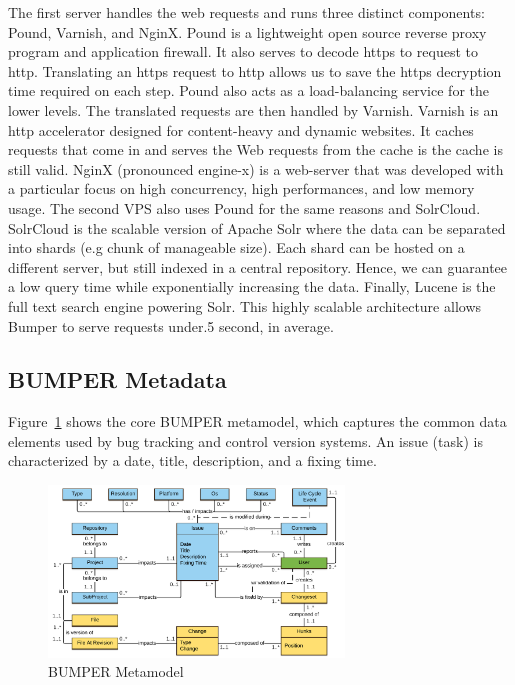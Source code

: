 \documentclass[conference]{IEEEtran}
\begin{document}
The first server handles the web requests and
runs three distinct components: Pound, Varnish, and NginX.
Pound is a lightweight open source reverse proxy program
and application firewall.
It also serves to decode https to request to http.
Translating an https request to http allows us to save the https decryption time required on each step.
Pound also acts as a load-balancing service for the lower levels.
The translated requests are then handled by Varnish.
Varnish is an http accelerator designed for content-heavy and dynamic websites.
It caches requests that come in and serves the Web requests from the cache is the cache is still valid.
NginX (pronounced engine-x) is a web-server that was developed with a particular focus on high concurrency, high performances, and low memory usage.
The second VPS also uses Pound for the same reasons and SolrCloud.
SolrCloud is the scalable version of Apache Solr where the data can be separated into shards (e.g chunk of manageable size).
Each shard can be hosted on a different server, but still indexed in a central repository.
Hence, we can guarantee a low query time while exponentially increasing the data.
Finally, Lucene is the full text search engine powering Solr.
This highly scalable architecture allows Bumper to serve requests under.5 second, in average.

\subsection{BUMPER Metadata}
\label{sub:BUMPER Metadata}

Figure~\ref{fig:bumper-metamodel}  shows the core BUMPER metamodel, which captures the common data elements used by bug tracking and control version systems.
An issue (task) is characterized by a date, title, description, and a fixing time.

\begin{figure}
  \centering
  \includegraphics[width=0.7\textwidth]{media/Bumper-Model.png}
  \caption{BUMPER Metamodel\label{fig:bumper-metamodel}}
\end{figure}
\end{document}
